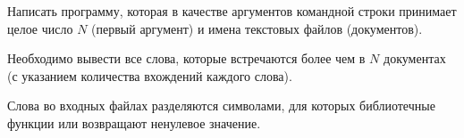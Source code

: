 
Написать программу, которая в качестве аргументов командной строки
принимает целое число $N$ (первый аргумент) и имена текстовых файлов
(документов).

Необходимо вывести все слова, которые встречаются более
чем в $N$ документах (с указанием количества вхождений каждого слова).

Слова во входных файлах разделяются символами, для которых
библиотечные функции  или  возвращают ненулевое
значение.
